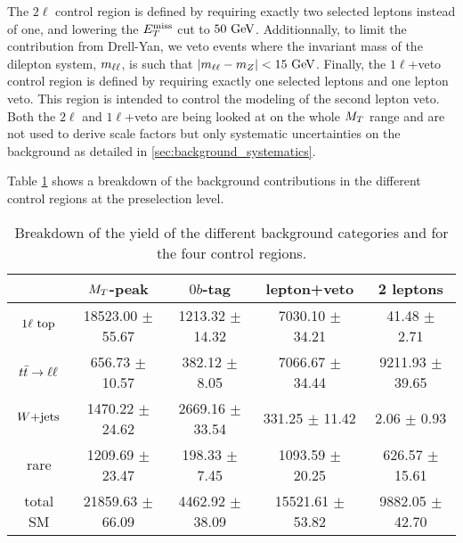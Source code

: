         The $2\ell$ control region is defined by requiring exactly two selected leptons instead of
        one, and lowering the $E_T^\text{miss}$ cut to $50 ~\text{GeV}$. Additionnally, to limit the contribution
        from Drell-Yan, we veto events where the invariant mass of the dilepton system, $m_{\ell\ell}$,
        is such that $\left|m_{\ell\ell} - m_{Z}\right| < 15 ~\text{GeV}$. Finally, the $1\ell$+veto control 
        region is defined by requiring exactly one selected leptons and one lepton veto. This region 
        is intended to control the modeling of the second lepton veto. Both the $2\ell$ and $1\ell$+veto
        are being looked at on the whole $M_T$ range and are not used to derive scale factors but only 
        systematic uncertainties on the background as detailed in \ref{sec:background_systematics}.

        Table \ref{tab:cutflowControlRegions} shows a breakdown of the background contributions in the 
        different control regions at the preselection level.

        \begin{table}[h!]
        \begin{tabular}{|c|cccc|}
            \hline
                             & $M_T$-peak             & $0b$-tag               & lepton+veto            & 2 leptons             \\ 
            \hline
             $1\ell~\text{top}$ & 18523.00 $\pm$ 55.67   &  1213.32 $\pm$ 14.32   &  7030.10 $\pm$ 34.21   &   41.48 $\pm$ 2.71    \\  
             $t\bar{t} \rightarrow \ell \ell$  &   656.73 $\pm$ 10.57   &   382.12 $\pm$ 8.05    &  7066.67 $\pm$ 34.44   & 9211.93 $\pm$ 39.65   \\
             $\text{$W$+jets}$        &  1470.22 $\pm$ 24.62   &  2669.16 $\pm$ 33.54   &   331.25 $\pm$ 11.42   &    2.06 $\pm$ 0.93    \\ 
             rare            &  1209.69 $\pm$ 23.47   &   198.33 $\pm$ 7.45    &  1093.59 $\pm$ 20.25   &  626.57 $\pm$ 15.61   \\
            \hline
             total SM        & 21859.63 $\pm$ 66.09   &  4462.92 $\pm$ 38.09   & 15521.61 $\pm$ 53.82   & 9882.05 $\pm$ 42.70   \\ 
            \hline
        \end{tabular}
            \caption{Breakdown of the yield of the different background categories and for the four control regions.}
            \label{tab:cutflowControlRegions}
        \end{table}


